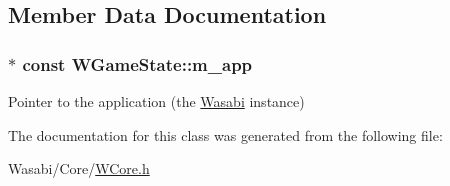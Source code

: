 \subsection{Member Data Documentation}
\subsubsection[{\texorpdfstring{m\+\_\+app}{m_app}}]{$\ast$ const W\+Game\+State\+::m\+\_\+app\hspace{0.3cm}{\ttfamily [protected]}}\hypertarget{class_w_game_state_a68c0b595d15be38854585e6cbcbe452b}{}\label{class_w_game_state_a68c0b595d15be38854585e6cbcbe452b}
Pointer to the application (the \hyperlink{class_wasabi}{Wasabi} instance) 

The documentation for this class was generated from the following file\+:\begin{DoxyCompactItemize}
\item 
Wasabi/\+Core/\hyperlink{_w_core_8h}{W\+Core.\+h}\end{DoxyCompactItemize}
